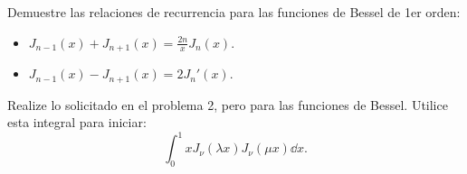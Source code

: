 \begin{ejercicio}
	Demuestre las relaciones de recurrencia para las funciones de Bessel de 1er orden:
	\begin{itemize}
		\item $J_{n - 1} (x) + J_{n + 1} (x) = \frac{2n}{x} J_n (x)$.
		\item $J_{n - 1} (x) - J_{n + 1} (x) = 2J_n ' (x)$.
	\end{itemize}
\end{ejercicio}












\begin{ejercicio}
	Realize lo solicitado en el problema 2, pero para las funciones de Bessel. Utilice esta integral para iniciar:
		$$ \int _0 ^1 x J_\nu (\lambda x) J_\nu (\mu x) \dd{x}. $$
\end{ejercicio}




















